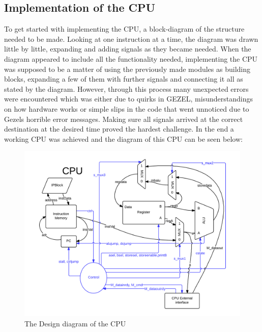 \documentclass[12pt,a4paper]{article}
\begin{document}
\subsection{Implementation of the CPU}
	To get started with implementing the CPU, a block-diagram of the structure needed to be made. Looking at one instruction at a time, the diagram was drawn little by little, expanding and adding signals as they became needed. When the diagram appeared to include all the functionality needed, implementing the CPU was supposed to be a matter of using the previously made modules as building blocks, expanding a few of them with further signals and connecting it all as stated by the diagram. However, through this process many unexpected errors were encountered which was either due to quirks in GEZEL, misunderstandings on how hardware works or simple slips in the code that went unnoticed due to Gezels horrible error messages. Making sure all signals arrived at the correct destination at the desired time proved the hardest challenge.  In the end a working CPU was achieved and the diagram of this CPU can be seen below:\\
	\begin{figure}[h!]
		\centering
			\includegraphics[width=1\textwidth]{Screenshots/CPU diagram.png}
		\caption{The Design diagram of the CPU}
		\label{DesignDiagram}
	\end{figure}
	\\	
	
\end{document}
